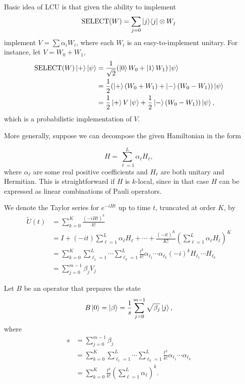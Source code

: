 \documentclass[11pt, oneside]{article}   	%
\begin{document}
Basic idea of LCU is that given the ability to implement 
\begin{equation*} 
\textrm{SELECT}(W) = \sum_{j= 0} \ket{j} \! \bra{j} \otimes W_j
\end{equation*}
implement $V = \sum \alpha_i W_i$, where each $W_i$ is an easy-to-implement unitary.
For instance, let $V = W_0 + W_1$,
\begin{align*} 
\textrm{SELECT}(W) \ket{+} \ket{\psi} 
&= \frac{1}{\sqrt{2}} (\ket{0} W_0 + \ket{1} W_1) \ket{\psi} \\
&= \frac{1}{2} (\ket{+} (W_0 + W_1) + \ket{-} (W_0 - W_1)) \ket{\psi} \\
&= \frac{1}{2} \ket{+} V \ket{\psi} + \frac{1}{2} \ket{-} (W_0 - W_1)) \ket{\psi},
\end{align*}
which is a probabilistic implementation of $V$.

More generally, suppose we can decompose the given Hamiltonian in the form

\begin{equation*} 
H = \sum^L_{\ell = 1} \alpha_{\ell} H_{\ell},
\end{equation*}
where $\alpha_{\ell}$ are some real positive coefficients and $H_{\ell}$ are both unitary and Hermitian.
This is straightforward if $H$ is $k$-local, since in that case $H$ can be expressed as linear combinations of Pauli operators.

We denote the Taylor series for $e^{-i H t}$ up to time $t$, truncated at order $K$, by
\begin{align*} 
\tilde{U}(t) 
&= \sum^K_{k = 0} \frac{(-iHt)^k}{k!} \\
&= I + (-it) \sum^L_{\ell = 1} \alpha_{\ell} H_{\ell} + \cdots + \frac{(-it)^K}{K!} \left( \sum^L_{\ell = 1} \alpha_{\ell} H_{\ell} \right)^K \\
&= \sum^K_{k = 0} \sum^L_{\ell_1 = 1} \cdots \sum^L_{\ell_k = 1} \frac{t^k}{k!} \alpha_{\ell_1} \cdots \alpha_{\ell_k} (-i)^k H_{\ell_1} \cdots H_{\ell_k} \\
&= \sum^{m-1}_{j = 0} \beta_j V_j
\end{align*}

Let $B$ be an operator that prepares the state
\begin{equation*} 
B \ket{0} = \ket{\beta} = \frac{1}{s} \sum^{m-1}_{j = 0} \sqrt{\beta_j} \ket{j},
\end{equation*}
where 
\begin{align*} 
s 
&= \sum^{m-1}_{j = 0} \beta_j \\
&= \sum^K_{k = 0} \sum^L_{\ell_1 = 1} \cdots \sum^L_{\ell_k = 1} \frac{t^k}{k!} \alpha_{\ell_1} \cdots \alpha_{\ell_k} \\
&= \sum^K_{k = 0}  \frac{t^k}{k!} \left( \sum^L_{\ell = 1} \alpha_{\ell} \right)^k.
\end{align*}
\end{document}
